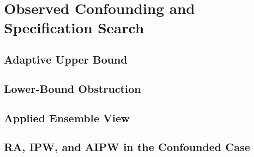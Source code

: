 \section{Observed Confounding and Specification Search}
\label{sec:observational-extensions}

%

\subsection{Adaptive Upper Bound}


\subsection{Lower-Bound Obstruction}


\subsection{Applied Ensemble View}


\subsection{RA, IPW, and AIPW in the Confounded Case}

